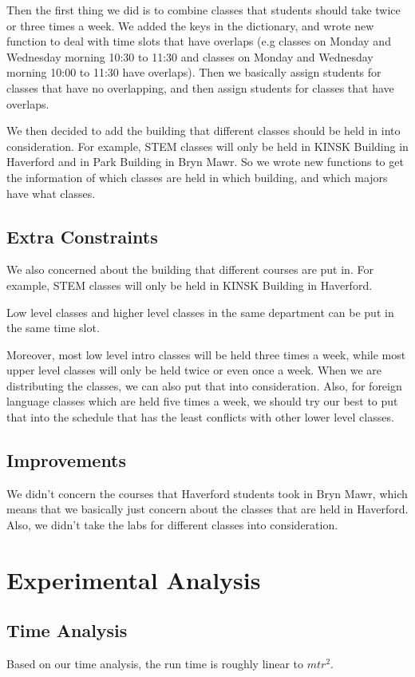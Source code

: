 \documentclass[11pt, oneside]{article}   	%
\begin{document}
Then the first thing we did is to combine classes that students should take twice or three times a week. We added the keys in the dictionary, and wrote new function to deal with time slots that have overlaps (e.g classes on Monday and Wednesday morning 10:30 to 11:30 and classes on Monday and Wednesday morning 10:00 to 11:30 have overlaps). Then we basically assign students for classes that have no overlapping, and then assign students for classes that have overlaps. 

We then decided to add the building that different classes should be held in into consideration. For example, STEM classes will only be held in KINSK Building in Haverford and in Park Building in Bryn Mawr. So we wrote new functions to get the information of which classes are held in which building, and which majors have what classes.

\subsection{Extra Constraints}
We also concerned about the building that different courses are put in. For example, STEM classes will only be held in KINSK Building in Haverford. 

Low level classes and higher level classes in the same department can be put in the same time slot. 

Moreover, most low level intro classes will be held three times a week, while most upper level classes will only be held twice or even once a week. When we are distributing the classes, we can also put that into consideration. Also, for foreign language classes which are held five times a week, we should try our best to put that into the schedule that has the least conflicts with other lower level classes. 


\subsection{Improvements}
We didn't concern the courses that Haverford students took in Bryn Mawr, which means that we basically just concern about the classes that are held in Haverford. Also, we didn't take the labs for different classes into consideration.



\newpage
\section{Experimental Analysis}
\subsection{Time Analysis}
Based on our time analysis, the run time is roughly linear to $mtr^2$.
\end{document}

